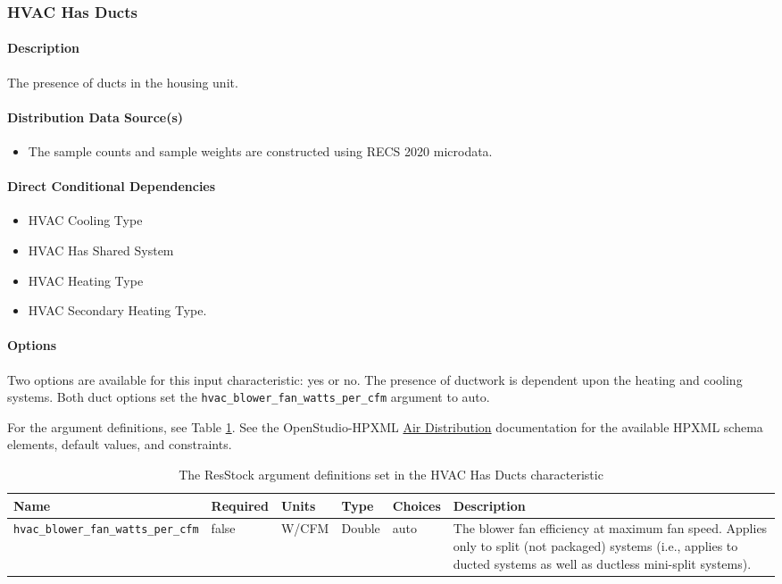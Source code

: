 \subsubsection{HVAC Has Ducts}

\paragraph{Description}

The presence of ducts in the housing unit.


\paragraph{Distribution Data Source(s)}
\begin{itemize}
\item The sample counts and sample weights are constructed using RECS 2020 microdata.
\end{itemize}

\paragraph{Direct Conditional Dependencies}
\begin{itemize}
    \item HVAC Cooling Type
    \item HVAC Has Shared System
    \item HVAC Heating Type
    \item HVAC Secondary Heating Type.
\end{itemize}


\paragraph{Options}
Two options are available for this input characteristic: yes or no. The presence of ductwork is dependent upon the heating and cooling systems. Both duct options set the \texttt{hvac\_blower\_fan\_watts\_per\_cfm} argument to auto.

For the argument definitions, see Table \ref{table:hc_arg_def_hvac_has_duct}. See the OpenStudio-HPXML \href{https://openstudio-hpxml.readthedocs.io/en/v1.8.1/workflow_inputs.html#air-distribution}{Air Distribution} documentation for the available HPXML schema elements, default values, and constraints.

\begin{longtable}[]{|p{3.5cm}|p{1.5cm}|p{1.3cm}|p{1.1cm}|p{}|p{3.3cm}|}\caption{The ResStock argument definitions set in the HVAC Has Ducts characteristic} \label{table:hc_arg_def_hvac_has_duct} \\
\toprule\noalign{}
Name & Required & Units & Type & Choices & Description \\
\midrule\noalign{}
\endhead
\bottomrule\noalign{}
\endlastfoot
\texttt{hvac\_blower\_fan\_watts\_per\_cfm} & false & W/CFM & Double &
auto & The blower fan efficiency at maximum fan speed. Applies only to
split (not packaged) systems (i.e., applies to ducted systems as well as
ductless mini-split systems). \\
\end{longtable}
